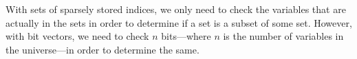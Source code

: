 With sets of sparsely stored indices, we only need to check the variables
that are actually in the sets in order to determine if a set is a subset
of some set. However, with bit vectors, we need to check $n$ bits---where $n$
is the number of variables in the universe---in order to determine the same.


\newpage
\begin{comment}
struct vertex* findrec(const std::set<uint16_t>& m, struct vertex* v) {
    for (int i = 0; i < v->children.size(); i++) {
        struct vertex* child = v->children[i];
        if (isSubset(child->m, m) {
            if (isSubset(m, child->z))
                return child;
            else
                findrec(m, child);
        }
    }
    return 0;
}
The function \texttt{isSubset} is just a one-line function that calls
\texttt{std::includes(...)}. One might notice that we do not check if the input
vertex contains the solution to the input modifier. However, we \emph{do} check
this in \texttt{find}:
struct vertex* find(const std::set<uint16_t>& m, struct vertex* v) {
    if (v == 0) return 0;
    if (isSubset(v->m, m) && isSubset(m, v->z) return v;
    return findrec(m, v);
}
\end{comment}
